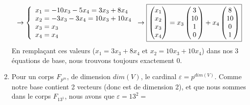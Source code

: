 \documentclass[10p,a4paper]{scrartcl}
\renewcommand{\(}{\left(}
\renewcommand{\)}{\right)}
\begin{document}
\begin{enumerate}
\begin{align*}
				\to 
				\left\{\begin{array}{l}
					x_1 = -10x_3 - 5x_4 = 3x_3 + 8x_4\\
					x_2 = -3x_3 - 3x_4 = 10x_3 + 10x_4\\
					x_3 = x_3\\
					x_4 = x_4
				\end{array}\right.
				\to
				\fbox{$
				\begin{pmatrix}
				x_1\\
				x_2\\
				x_3\\
				x_4
				\end{pmatrix}
				=
				x_3
				\begin{pmatrix}
					3\\
					10\\
					1\\
					0
				\end{pmatrix}
				+ x_4
				\begin{pmatrix}
					8\\
					10\\
					0\\
					1
				\end{pmatrix}$}
			\end{align*}
			En remplaçant ces valeurs \big($x_1 = 3x_3 + 8x_4$ et $x_2 = 10x_3 + 10x_4$\big) dans nos 3 équations de base, nous trouvons toujours exactement 0.

	\item	Pour un corps $F_{p^m}$, de dimension $dim(V)$, le cardinal $\varepsilon = p^{dim(V)}$. Comme notre base contient 2 vecteurs (donc est de dimension 2), et que nous sommes dans le corps $F_{13^1}$, nous avons que $\varepsilon = 13^2 =$ 
\end{enumerate}
\end{document}
